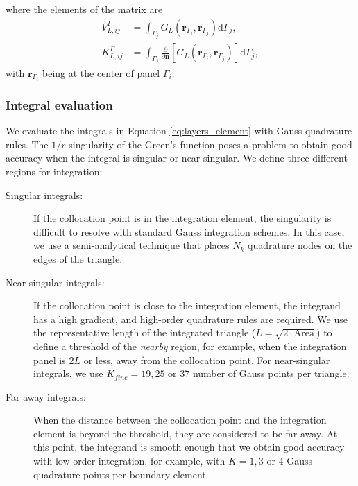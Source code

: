%
where the elements of the matrix are
\begin{align} \label{eq:layers_element}
V_{L,ij}^{\Gamma} &= \int_{\Gamma_j} G_L(\mathbf{r}_{\Gamma_i},\mathbf{r}_{\Gamma_j})  \mathrm{d} \Gamma_j, \nonumber \\
K_{L,ij}^{\Gamma} &= \int_{\Gamma_j} \frac{\partial}{\partial \mathbf{n}} \left[ G_L(\mathbf{r}_{\Gamma_i},\mathbf{r}_{\Gamma_j}) \right]\mathrm{d} \Gamma_j,
\end{align}
%
with $\mathbf{r}_{\Gamma_i}$ being at the center of panel $\Gamma_i$.


\subsubsection{Integral evaluation}

We evaluate the integrals in Equation \eqref{eq:layers_element} with Gauss quadrature
rules. The $1/r$ singularity of the Green's function poses a
problem to obtain good accuracy when the integral is 
singular or near-singular. We define three different regions for integration:

\begin{description}

\item[Singular integrals:] If the collocation point is in the integration element,
the singularity is difficult to resolve with standard
Gauss integration schemes. In this case, we use a semi-analytical technique 
\cite{HessSmith1967,ZhuHuangSongWhite2001} that places $N_k$ quadrature nodes on the 
edges of the triangle.

\item[Near singular integrals:] If the collocation point is close to the integration element,
the integrand has a high gradient, and high-order quadrature rules are required. 
We use the representative length of the integrated triangle ($L = \sqrt{2\cdot\text{Area}}$)
to define a threshold of the \emph{nearby} region, for example, when the integration panel 
is $2L$ or less, away from the collocation point. For near-singular integrals, we use  
$K_{fine}=19, 25  \text{ or }  37$ number of Gauss points per triangle. 

\item[Far away integrals:] When the distance between the collocation point and the integration
element is beyond the threshold, they are considered to be far away. 
At this point, the integrand is smooth enough that we obtain good 
accuracy with low-order integration, for example, with 
$K=1, 3  \text{ or } 4$ Gauss quadrature points per boundary element. 
\end{description}

